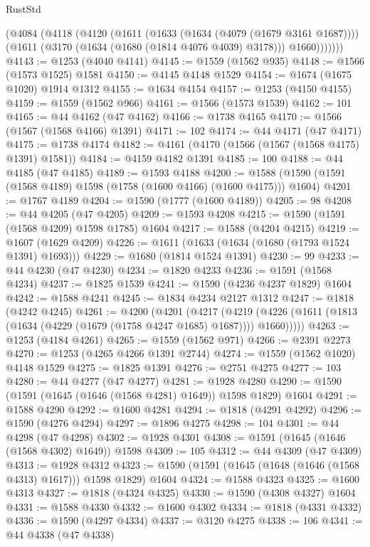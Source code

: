\begin{lexlean}{RustStd}
\begin{coremodule}
        (@4084
          (@4118
            (@4120
              (@1611
                (@1633 (@1634 (@4079 (@1679 @3161 @1687))))
                (@1611 (@3170 (@1634 (@1680 (@1814 @4076 @4039) @3178))) @1660)))))))
@4143 := @1253 (@4040 @4141)
@4145 := @1559 (@1562 @935)
@4148 := @1566 (@1573 @1525) @1581
@4150 := @4145 @4148 @1529
@4154 := @1674 (@1675 @1020) @1914 @1312
@4155 := @1634 @4154
@4157 := @1253 (@4150 @4155)
@4159 := @1559 (@1562 @966)
@4161 := @1566 (@1573 @1539)
@4162 := 101
@4165 := @44 @4162 (@47 @4162)
@4166 := @1738 @4165
@4170 := @1566 (@1567 (@1568 @4166) @1391)
@4171 := 102
@4174 := @44 @4171 (@47 @4171)
@4175 := @1738 @4174
@4182 := @4161 (@4170 (@1566 (@1567 (@1568 @4175) @1391) @1581))
@4184 := @4159 @4182 @1391
@4185 := 100
@4188 := @44 @4185 (@47 @4185)
@4189 := @1593 @4188
@4200 := @1588 (@1590 (@1591 (@1568 @4189) @1598 (@1758 (@1600 @4166) (@1600 @4175))) @1604)
@4201 := @1767 @4189
@4204 := @1590 (@1777 (@1600 @4189))
@4205 := 98
@4208 := @44 @4205 (@47 @4205)
@4209 := @1593 @4208
@4215 := @1590 (@1591 (@1568 @4209) @1598 @1785) @1604
@4217 := @1588 (@4204 @4215)
@4219 := @1607 (@1629 @4209)
@4226 := @1611 (@1633 (@1634 (@1680 (@1793 @1524 @1391) @1693)))
@4229 := @1680 (@1814 @1524 @1391)
@4230 := 99
@4233 := @44 @4230 (@47 @4230)
@4234 := @1820 @4233
@4236 := @1591 (@1568 @4234)
@4237 := @1825 @1539
@4241 := @1590 (@4236 @4237 @1829) @1604
@4242 := @1588 @4241
@4245 := @1834 @4234 @2127 @1312
@4247 := @1818 (@4242 @4245)
@4261 := @4200
    (@4201
      (@4217
        (@4219 (@4226 (@1611 (@1813 (@1634 (@4229 (@1679 (@1758 @4247 @1685) @1687)))) @1660)))))
@4263 := @1253 (@4184 @4261)
@4265 := @1559 (@1562 @971)
@4266 := @2391 @2273
@4270 := @1253 (@4265 @4266 @1391 @2744)
@4274 := @1559 (@1562 @1020) @4148 @1529
@4275 := @1825 @1391
@4276 := @2751 @4275
@4277 := 103
@4280 := @44 @4277 (@47 @4277)
@4281 := @1928 @4280
@4290 := @1590 (@1591 (@1645 (@1646 (@1568 @4281) @1649)) @1598 @1829) @1604
@4291 := @1588 @4290
@4292 := @1600 @4281
@4294 := @1818 (@4291 @4292)
@4296 := @1590 (@4276 @4294)
@4297 := @1896 @4275
@4298 := 104
@4301 := @44 @4298 (@47 @4298)
@4302 := @1928 @4301
@4308 := @1591 (@1645 (@1646 (@1568 @4302) @1649)) @1598
@4309 := 105
@4312 := @44 @4309 (@47 @4309)
@4313 := @1928 @4312
@4323 := @1590 (@1591 (@1645 (@1648 (@1646 (@1568 @4313) @1617))) @1598 @1829) @1604
@4324 := @1588 @4323
@4325 := @1600 @4313
@4327 := @1818 (@4324 @4325)
@4330 := @1590 (@4308 @4327) @1604
@4331 := @1588 @4330
@4332 := @1600 @4302
@4334 := @1818 (@4331 @4332)
@4336 := @1590 (@4297 @4334)
@4337 := @3120 @4275
@4338 := 106
@4341 := @44 @4338 (@47 @4338)

\end{coremodule}
\end{lexlean}
